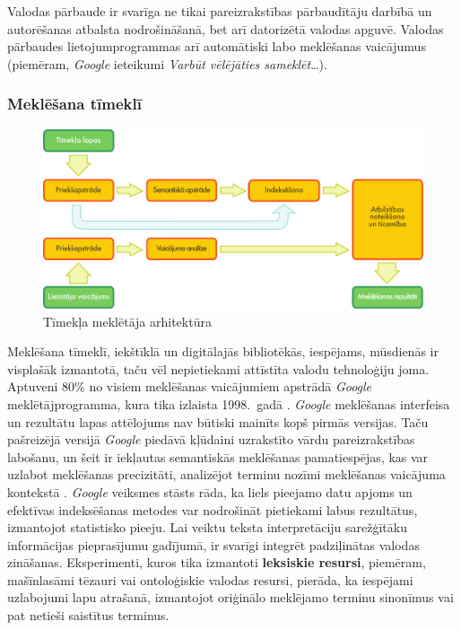 \begin{multicols}{2}
Valodas pārbaude ir svarīga ne tikai pareizrakstības pārbaudītāju darbībā un autorēšanas atbalsta nodrošināšanā, bet arī datorizētā valodas apguvē.
Valodas pārbaudes lietojumprogrammas arī automātiski labo meklēšanas vaicājumus (piemēram, \textit{Google} ieteikumi \textit{Varbūt vēlējāties sameklēt}\dots). 

\subsubsection{Meklēšana tīmeklī}

\begin{figure}[htb]
  \center
  \includegraphics[width=\textwidth]{../_media/latvian/web_search_architecture}
  \caption{Tīmekļa meklētāja arhitektūra}
  \label{fig:websearcharch_de}
\end{figure}

Meklēšana tīmeklī, iekštīklā un digitālajās bibliotēkās, iespējams, mūsdienās ir visplašāk izmantotā, taču vēl nepietiekami attīstīta valodu tehnoloģiju joma.  Aptuveni 80\% no visiem meklēšanas vaicājumiem apstrādā\textit{ Google} meklētājprogramma, kura tika izlaista 1998.~gadā \cite{Meta16}.  \textit{Google} meklēšanas interfeisa un rezultātu lapas attēlojums nav būtiski mainīts kopš pirmās versijas.  Taču pašreizējā versijā \textit{Google} piedāvā kļūdaini uzrakstīto vārdu pareizrakstības labošanu, un šeit ir iekļautas semantiskās meklēšanas pamatiespējas, kas var uzlabot meklēšanas precizitāti, analizējot terminu nozīmi meklēšanas vaicājuma kontekstā \cite{Meta17}.  \textit{Google} veiksmes stāsts rāda, ka liels pieejamo datu apjoms un efektīvas indeksēšanas metodes var nodrošināt pietiekami labus rezultātus, \mbox{izmantojot} statistisko pieeju.
%
Lai veiktu teksta interpretāciju sarežģītāku informācijas pieprasījumu gadījumā, ir svarīgi integrēt padziļinātas valodas zināšanas.  Eksperimenti, kuros tika izmantoti \textbf{leksiskie resursi}, piemēram, mašīnlasāmi tēzauri vai ontoloģiskie valodas resursi, pierāda, ka iespējami uzlabojumi lapu atrašanā, izmantojot oriģinālo meklējamo terminu sinonīmus vai pat netieši saistītus terminus.


\end{multicols}
